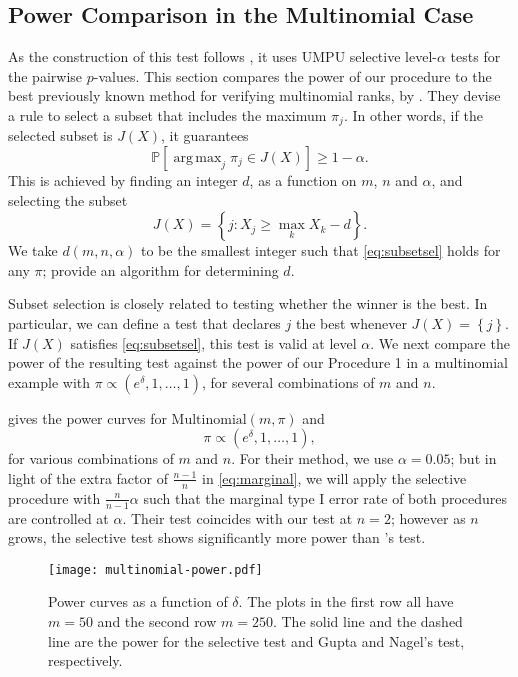 \documentclass[aos, authoryear]{imsart}
\theoremstyle{definition}
\theoremstyle{custom}
\newcommand{\PP}{\mathbb{P}}
\DeclareMathOperator*{\argmax}{arg\,max}
\begin{document}
\subsection{Power Comparison in the Multinomial Case}
\label{sec:subsetsel}

As the construction of this test follows \citet{Fithian:2014ws}, it uses UMPU selective level-$\alpha$ tests for the pairwise $p$-values. This section compares the power of our procedure to the best previously known method for verifying multinomial ranks, by \citet{Gupta:1967wg}. They devise a rule to select a subset that includes the maximum $\pi_j$. In other words, if the selected subset is $J\left(X\right)$, it guarantees
\begin{equation}
\label{eq:subsetsel}
\PP\left[\argmax_j \pi_j \in J\left(X\right)\right] \ge 1 - \alpha.
\end{equation}
This is achieved by finding an integer $d$, as a function on $m$, $n$ and $\alpha$, and selecting the subset
\[J\left(X\right) = \left\{j: X_j \ge \max_k X_k - d\right\}.\]
We take $d(m, n, \alpha)$ to be the smallest integer such that \eqref{eq:subsetsel} holds for any $\pi$; \citet{Gupta:1967wg} provide an algorithm for determining $d$.

Subset selection is closely related to testing whether the winner is the best. In particular, we can define a test that declares $j$ the best whenever $J\left(X\right) = \left\{j\right\}$. If $J\left(X\right)$ satisfies \eqref{eq:subsetsel}, this test is valid at level $\alpha$. We next compare the power of the resulting test against the power of our Procedure 1 in a multinomial example with $\pi \propto \left(e^\delta, 1, \ldots, 1\right)$, for several combinations of $m$ and $n$.

 gives the power curves for $\text{Multinomial}\left(m, \pi\right)$ and
\[\pi \propto \left(e^\delta, 1, \ldots, 1\right),\]
for various combinations of $m$ and $n$. For their method, we use $\alpha = 0.05$; but in light of the extra factor of $\frac{n-1}{n}$ in \eqref{eq:marginal}, we will apply the selective procedure with $\frac{n}{n-1} \alpha$ such that the marginal type I error rate of both procedures are controlled at $\alpha$. Their test coincides with our test at $n = 2$; however as $n$ grows, the selective test shows significantly more power than \citeauthor{Gupta:1967wg}'s test.

\begin{figure}[htbp]
\centering
\texttt{[image: multinomial-power.pdf]}
\caption{Power curves as a function of $\delta$. The plots in the first row all have $m = 50$ and the second row $m = 250$. The solid line and the dashed line are the power for the selective test and Gupta and Nagel's test, respectively.}
\label{fig:power}
\end{figure}
\end{document}
